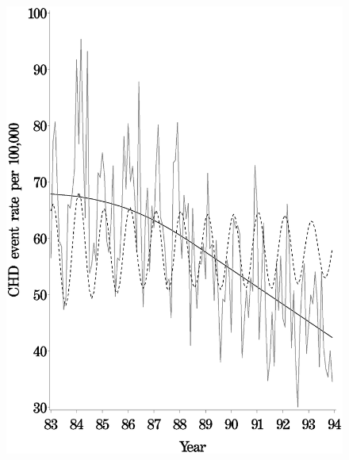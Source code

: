 \begin{figure}[!h]
{    \includegraphics[scale=0.2]{figures/estimates_combined_belfast.eps}
    }


\end{figure}
